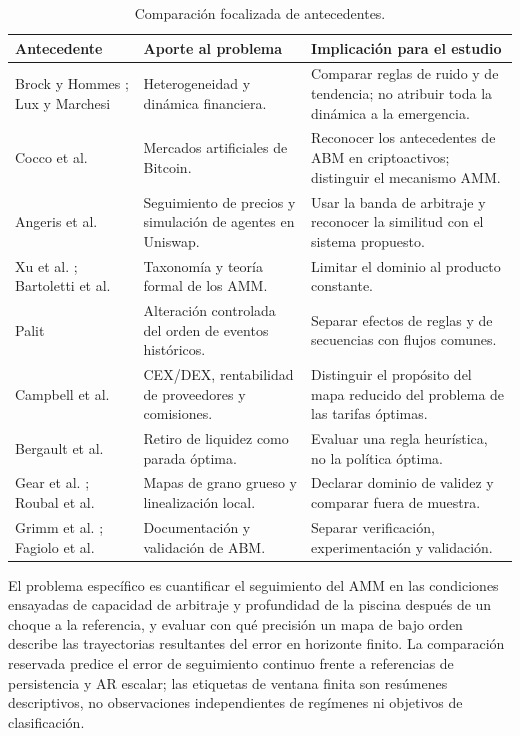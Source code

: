 \begin{table}[htbp]
\centering
\caption{Comparación focalizada de antecedentes.}
\label{tab:antecedentes}
\small
\begin{tabularx}{\textwidth}{@{}>{\raggedright\arraybackslash}p{3.3cm} >{\raggedright\arraybackslash}X >{\raggedright\arraybackslash}X@{}}
\toprule
Antecedente & Aporte al problema & Implicación para el estudio \\
\midrule
Brock y Hommes \cite{brock1998heterogeneous}; Lux y Marchesi \cite{lux1999scaling} & Heterogeneidad y dinámica financiera. & Comparar reglas de ruido y de tendencia; no atribuir toda la dinámica a la emergencia. \\
Cocco et al. \cite{cocco2017artificial,cocco2019agent} & Mercados artificiales de Bitcoin. & Reconocer los antecedentes de ABM en criptoactivos; distinguir el mecanismo AMM. \\
Angeris et al. \cite{angeris2020uniswap} & Seguimiento de precios y simulación de agentes en Uniswap. & Usar la banda de arbitraje y reconocer la similitud con el sistema propuesto. \\
Xu et al. \cite{xu2023sok}; Bartoletti et al. \cite{bartoletti2022theory} & Taxonomía y teoría formal de los AMM. & Limitar el dominio al producto constante. \\
Palit \cite{palit2022shuffled} & Alteración controlada del orden de eventos históricos. & Separar efectos de reglas y de secuencias con flujos comunes. \\
Campbell et al. \cite{campbell2025optimal} & CEX/DEX, rentabilidad de proveedores y comisiones. & Distinguir el propósito del mapa reducido del problema de las tarifas óptimas. \\
Bergault et al. \cite{bergault2025exit} & Retiro de liquidez como parada óptima. & Evaluar una regla heurística, no la política óptima. \\
Gear et al. \cite{gear2003equationfree}; Roubal et al. \cite{roubal2010linearization} & Mapas de grano grueso y linealización local. & Declarar dominio de validez y comparar fuera de muestra. \\
Grimm et al. \cite{grimm2020odd}; Fagiolo et al. \cite{fagiolo2007critical} & Documentación y validación de ABM. & Separar verificación, experimentación y validación. \\
\bottomrule
\end{tabularx}
\end{table}

El problema específico es cuantificar el seguimiento del AMM en las condiciones ensayadas de capacidad de arbitraje y profundidad de la piscina después de un choque a la referencia, y evaluar con qué precisión un mapa de bajo orden describe las trayectorias resultantes del error en horizonte finito. La comparación reservada predice el error de seguimiento continuo frente a referencias de persistencia y AR escalar; las etiquetas de ventana finita son resúmenes descriptivos, no observaciones independientes de regímenes ni objetivos de clasificación.

